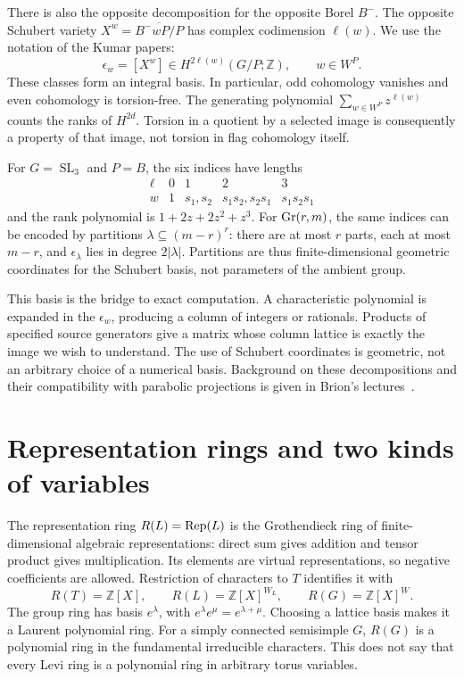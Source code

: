 \documentclass[11pt,letterpaper]{article}
\newcommand{\Z}{\mathbb Z}\newcommand{\Q}{\mathbb Q}\newcommand{\C}{\mathbb C}
\newcommand{\SL}{\operatorname{SL}}\newcommand{\GL}{\operatorname{GL}}
\newcommand{\eps}{\epsilon}\newcommand{\poly}{\mathrm{poly}}
\theoremstyle{definition}\newtheorem{definition}[theorem]{Definition}
\begin{document}
There is also the opposite decomposition for the opposite Borel
\(B^-\). The opposite Schubert variety
\(X^w=\overline{B^-wP/P}\) has complex codimension \(\ell(w)\).
We use the notation of the Kumar papers:
\[
 \eps_w=[X^w]\in H^{2\ell(w)}(G/P;\Z),\qquad w\in W^P.
 \tag{2}
\]
These classes form an integral basis. In particular, odd cohomology
vanishes and even cohomology is torsion-free. The generating polynomial
\(\sum_{w\in W^P}z^{\ell(w)}\) counts the ranks of \(H^{2d}\).
Torsion in a quotient by a selected image is consequently a property
of that image, not torsion in flag cohomology itself.

For \(G=\SL_3\) and \(P=B\), the six indices have lengths
\[
\begin{array}{c|cccc}
\ell&0&1&2&3\\ \hline
w&1&s_1,s_2&s_1s_2,s_2s_1&s_1s_2s_1
\end{array}
\]
and the rank polynomial is \(1+2z+2z^2+z^3\).
For \(\operatorname{Gr}(r,m)\), the same indices can be encoded by partitions
\(\lambda\subseteq(m-r)^r\): there are at most \(r\) parts, each at
most \(m-r\), and \(\eps_\lambda\) lies in degree \(2|\lambda|\).
Partitions are thus finite-dimensional geometric coordinates for the
Schubert basis, not parameters of the ambient group.

This basis is the bridge to exact computation. A characteristic
polynomial is expanded in the \(\eps_w\), producing a column of integers
or rationals. Products of specified source generators give a matrix
whose column lattice is exactly the image we wish to understand.
The use of Schubert coordinates is geometric, not an arbitrary
choice of a numerical basis. Background on these decompositions and
their compatibility with parabolic projections is given in
Brion's lectures~\cite{Brion}.

\section{Representation rings and two kinds of variables}
The representation ring \(R(L)=\operatorname{Rep}(L)\) is the Grothendieck ring of
finite-dimensional algebraic representations: direct sum gives addition
and tensor product gives multiplication. Its elements are virtual
representations, so negative coefficients are allowed. Restriction of
characters to \(T\) identifies it with
\[
 R(T)=\Z[X],\qquad R(L)=\Z[X]^{W_L},\qquad R(G)=\Z[X]^W.
 \tag{3}
\]
The group ring has basis \(e^\lambda\), with
\(e^\lambda e^\mu=e^{\lambda+\mu}\).
Choosing a lattice basis makes it a Laurent polynomial ring.
For a simply connected semisimple \(G\), \(R(G)\) is a polynomial
ring in the fundamental irreducible characters. This does not say
that every Levi ring is a polynomial ring in arbitrary torus variables.
\end{document}
